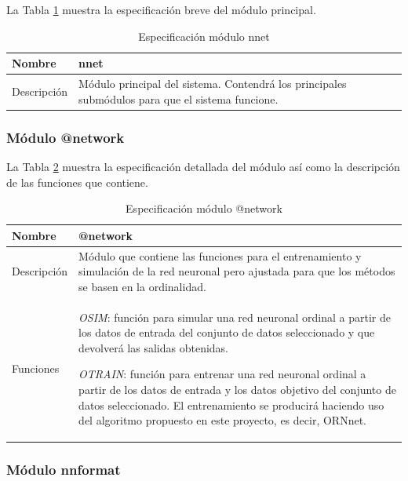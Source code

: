 			La Tabla \ref{modulo_nnet} muestra la especificación breve del módulo principal.
			
			\begin{table}[!h]
				\centering
				\begin{tabular}{l|p{.5\linewidth}}
					\hline Nombre & nnet \\ 
					\hline Descripción & Módulo principal del sistema. Contendrá los principales submódulos para que el sistema funcione. \\ 
					\hline 
				\end{tabular}
				\caption{Especificación módulo nnet}
				\label{modulo_nnet}
			\end{table}
		
			\subsubsection{Módulo @network}
			
			La Tabla \ref{modulo_@network} muestra la especificación detallada del módulo así como la descripción de las funciones que contiene.
			
			\begin{table}[!h]
				\centering
				\begin{tabular}{l|p{.5\linewidth}}
					\hline Nombre & @network \\ 
					\hline Descripción & Módulo que contiene las funciones para el entrenamiento y simulación de la red neuronal pero ajustada para que los métodos se basen en la ordinalidad. \\ 
					\hline Funciones & \textit{OSIM}: función para simular una red neuronal ordinal a partir de los datos de entrada del conjunto de datos seleccionado y que devolverá las salidas obtenidas.
					
					\textit{OTRAIN}: función para entrenar una red neuronal ordinal a partir de los datos de entrada y los datos objetivo del conjunto de datos seleccionado. El entrenamiento se producirá haciendo uso del algoritmo propuesto en este proyecto, es decir, ORNnet. \\ 
					\hline 
				\end{tabular}
				\caption{Especificación módulo @network}
				\label{modulo_@network}
			\end{table}
			
			\subsubsection{Módulo nnformat}
		
